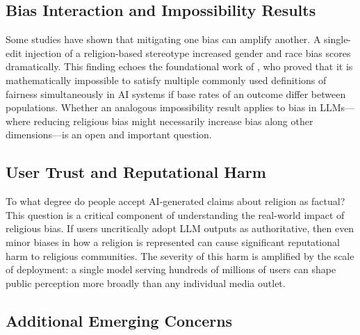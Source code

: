 \documentclass[]{fairmeta}
\begin{document}
\subsection{Bias Interaction and Impossibility Results}

Some studies have shown that mitigating one bias can amplify another. A single-edit injection of a religion-based stereotype increased gender and race bias scores dramatically. This finding echoes the foundational work of \citet{kleinberg2016}, who proved that it is mathematically impossible to satisfy multiple commonly used definitions of fairness simultaneously in AI systems if base rates of an outcome differ between populations. Whether an analogous impossibility result applies to bias in LLMs---where reducing religious bias might necessarily increase bias along other dimensions---is an open and important question.

\subsection{User Trust and Reputational Harm}

To what degree do people accept AI-generated claims about religion as factual? This question is a critical component of understanding the real-world impact of religious bias. If users uncritically adopt LLM outputs as authoritative, then even minor biases in how a religion is represented can cause significant reputational harm to religious communities. The severity of this harm is amplified by the scale of deployment: a single model serving hundreds of millions of users can shape public perception more broadly than any individual media outlet.

\subsection{Additional Emerging Concerns}
\end{document}
